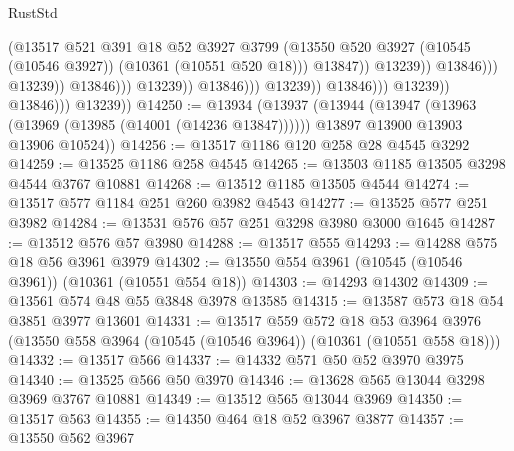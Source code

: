 \begin{lexlean}{RustStd}
\begin{coremodule}
                                                            (@13517
                                                              @521
                                                              @391
                                                              @18
                                                              @52
                                                              @3927
                                                              @3799
                                                              (@13550
                                                                @520
                                                                @3927
                                                                (@10545 (@10546 @3927))
                                                                (@10361 (@10551 @520 @18)))
                                                              @13847))
                                                          @13239))
                                                      @13846)))
                                                @13239))
                                            @13846)))
                                      @13239))
                                  @13846)))
                            @13239))
                        @13846)))
                  @13239))
              @13846)))
        @13239))
@14250 := @13934
    (@13937
      (@13944
        (@13947 (@13963 (@13969 (@13985 (@14001 (@14236 @13847))))))
        @13897
        @13900
        @13903
        @13906
        @10524))
@14256 := @13517 @1186 @120 @258 @28 @4545 @3292
@14259 := @13525 @1186 @258 @4545
@14265 := @13503 @1185 @13505 @3298 @4544 @3767 @10881
@14268 := @13512 @1185 @13505 @4544
@14274 := @13517 @577 @1184 @251 @260 @3982 @4543
@14277 := @13525 @577 @251 @3982
@14284 := @13531 @576 @57 @251 @3298 @3980 @3000 @1645
@14287 := @13512 @576 @57 @3980
@14288 := @13517 @555
@14293 := @14288 @575 @18 @56 @3961 @3979
@14302 := @13550 @554 @3961 (@10545 (@10546 @3961)) (@10361 (@10551 @554 @18))
@14303 := @14293 @14302
@14309 := @13561 @574 @48 @55 @3848 @3978 @13585
@14315 := @13587 @573 @18 @54 @3851 @3977 @13601
@14331 := @13517
    @559
    @572
    @18
    @53
    @3964
    @3976
    (@13550 @558 @3964 (@10545 (@10546 @3964)) (@10361 (@10551 @558 @18)))
@14332 := @13517 @566
@14337 := @14332 @571 @50 @52 @3970 @3975
@14340 := @13525 @566 @50 @3970
@14346 := @13628 @565 @13044 @3298 @3969 @3767 @10881
@14349 := @13512 @565 @13044 @3969
@14350 := @13517 @563
@14355 := @14350 @464 @18 @52 @3967 @3877
@14357 := @13550 @562 @3967

\end{coremodule}
\end{lexlean}
